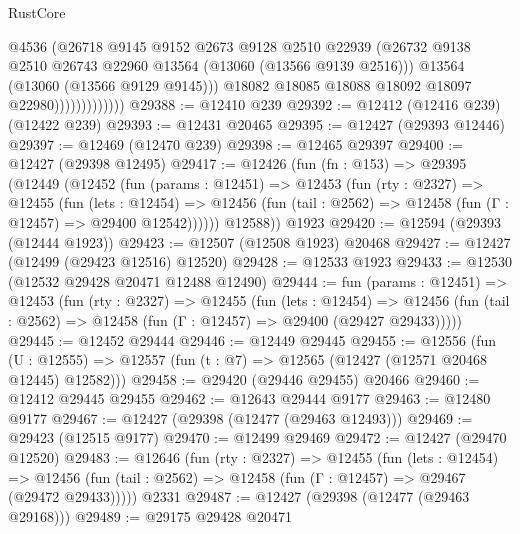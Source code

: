 \begin{lexlean}{RustCore}
\begin{coremodule}
                              @4536
                              (@26718
                                @9145
                                @9152
                                @2673
                                @9128
                                @2510
                                @22939
                                (@26732
                                  @9138
                                  @2510
                                  @26743
                                  @22960
                                  @13564
                                  (@13060 (@13566 @9139 @2516)))
                                @13564
                                (@13060 (@13566 @9129 @9145)))
                              @18082
                              @18085
                              @18088
                              @18092
                              @18097
                              @22980)))))))))))))
@29388 := @12410 @239
@29392 := @12412 (@12416 @239) (@12422 @239)
@29393 := @12431 @20465
@29395 := @12427 (@29393 @12446)
@29397 := @12469 (@12470 @239)
@29398 := @12465 @29397
@29400 := @12427 (@29398 @12495)
@29417 := @12426
    (fun (fn : @153) =>
    @29395
      (@12449
        (@12452
          (fun (params : @12451) =>
          @12453
            (fun (rty : @2327) =>
            @12455
              (fun (lets : @12454) =>
              @12456 (fun (tail : @2562) => @12458 (fun (Γ : @12457) => @29400 @12542))))))
        @12588))
    @1923
@29420 := @12594 (@29393 (@12444 @1923))
@29423 := @12507 (@12508 @1923) @20468
@29427 := @12427 (@12499 (@29423 @12516) @12520)
@29428 := @12533 @1923
@29433 := @12530 (@12532 @29428 @20471 @12488 @12490)
@29444 := fun (params : @12451) =>
  @12453
    (fun (rty : @2327) =>
    @12455
      (fun (lets : @12454) =>
      @12456 (fun (tail : @2562) => @12458 (fun (Γ : @12457) => @29400 (@29427 @29433)))))
@29445 := @12452 @29444
@29446 := @12449 @29445
@29455 := @12556
    (fun (U : @12555) => @12557 (fun (t : @7) => @12565 (@12427 (@12571 @20468 @12445) @12582)))
@29458 := @29420 (@29446 @29455) @20466
@29460 := @12412 @29445 @29455
@29462 := @12643 @29444 @9177
@29463 := @12480 @9177
@29467 := @12427 (@29398 (@12477 (@29463 @12493)))
@29469 := @29423 (@12515 @9177)
@29470 := @12499 @29469
@29472 := @12427 (@29470 @12520)
@29483 := @12646
    (fun (rty : @2327) =>
    @12455
      (fun (lets : @12454) =>
      @12456 (fun (tail : @2562) => @12458 (fun (Γ : @12457) => @29467 (@29472 @29433)))))
    @2331
@29487 := @12427 (@29398 (@12477 (@29463 @29168)))
@29489 := @29175 @29428 @20471

\end{coremodule}
\end{lexlean}
